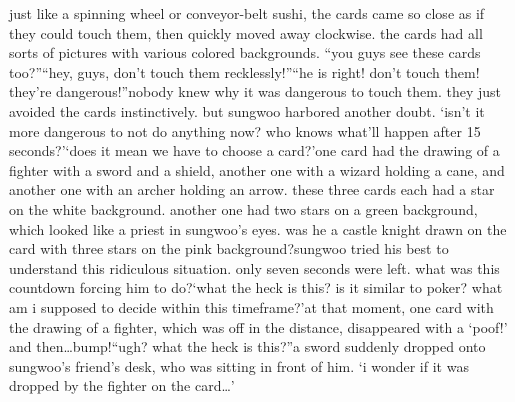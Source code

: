 just like a spinning wheel or conveyor-belt sushi, the cards came so close as if they could touch them, then quickly moved away clockwise.
 the cards had all sorts of pictures with various colored backgrounds.
“you guys see these cards too?”“hey, guys, don’t touch them recklessly!”“he is right! don’t touch them! they’re dangerous!”nobody knew why it was dangerous to touch them.
 they just avoided the cards instinctively.
 but sungwoo harbored another doubt.
‘isn’t it more dangerous to not do anything now? who knows what’ll happen after 15 seconds?’‘does it mean we have to choose a card?’one card had the drawing of a fighter with a sword and a shield, another one with a wizard holding a cane, and another one with an archer holding an arrow.
 these three cards each had a star on the white background.
another one had two stars on a green background, which looked like a priest in sungwoo’s eyes.
 was he a castle knight drawn on the card with three stars on the pink background?sungwoo tried his best to understand this ridiculous situation.
 only seven seconds were left.
 what was this countdown forcing him to do?‘what the heck is this? is it similar to poker? what am i supposed to decide within this timeframe?’at that moment, one card with the drawing of a fighter, which was off in the distance, disappeared with a ‘poof!’ and then…bump!“ugh? what the heck is this?”a sword suddenly dropped onto sungwoo’s friend’s desk, who was sitting in front of him.
‘i wonder if it was dropped by the fighter on the card…’

 